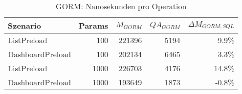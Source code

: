 
\begin{table}[ht]
\centering
\caption{GORM: Nanosekunden pro Operation}
\begin{tabular}{lrrrr}
\toprule
Szenario & Params & ${M_{GORM}}$ & ${QA_{GORM}}$ & ${\Delta M_{GORM,SQL}}$  \\
\midrule

	ListPreload & 100 & 221396 & 5194 & 9.9\% \\
	DashboardPreload & 100 & 202134 & 6465 & 3.3\% \\
	ListPreload & 1000 & 226703 & 4176 & 14.8\% \\
	DashboardPreload & 1000 & 193649 & 1873 & -0.8\% \\
\bottomrule
\end{tabular}
\label{tab:benchmark_gorm_nsperop}
\end{table}
	